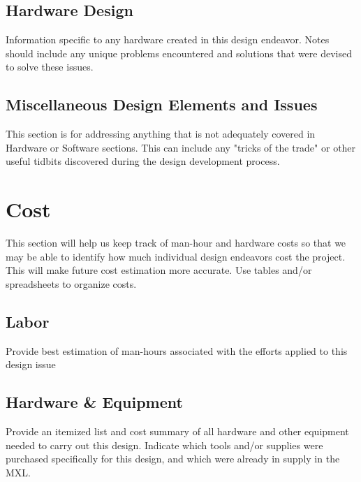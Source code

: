 \documentclass{mxl-design}
\begin{document}
\subsection{Hardware Design}

Information specific to any hardware created in this design endeavor.  Notes should include any unique problems encountered and solutions that were devised to solve these issues.

\subsection{Miscellaneous Design Elements and Issues}

This section is for addressing anything that is not adequately covered in Hardware or Software sections.  This can include any "tricks of the trade" or other useful tidbits discovered during the design development process.

\section{Cost}

This section will help us keep track of man-hour and hardware costs so that we may be able to identify how much individual design endeavors cost the project.  This will make future cost estimation more accurate.  Use tables and/or spreadsheets to organize costs.

\subsection{Labor}

Provide best estimation of man-hours associated with the efforts applied to this design issue

\subsection{Hardware \& Equipment}

Provide an itemized list and cost summary of all hardware and other equipment needed to carry out this design.  Indicate which tools and/or supplies were purchased specifically for this design, and which were already in supply in the MXL.
\end{document}
